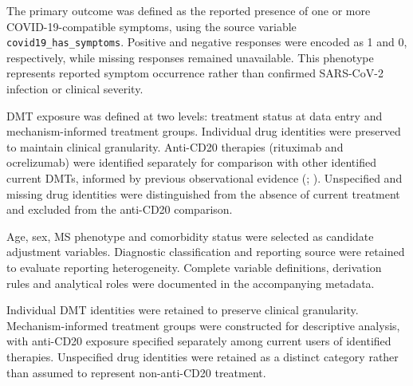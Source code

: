 \documentclass[
  british,
]{article}
\begin{document}
The primary outcome was defined as the reported presence of one or more
COVID-19-compatible symptoms, using the source variable
\texttt{covid19\_has\_symptoms}. Positive and negative responses were
encoded as 1 and 0, respectively, while missing responses remained
unavailable. This phenotype represents reported symptom occurrence
rather than confirmed SARS-CoV-2 infection or clinical severity.

DMT exposure was defined at two levels: treatment status at data entry
and mechanism-informed treatment groups. Individual drug identities were
preserved to maintain clinical granularity. Anti-CD20 therapies
(rituximab and ocrelizumab) were identified separately for comparison
with other identified current DMTs, informed by previous observational
evidence (;
). Unspecified and
missing drug identities were distinguished from the absence of current
treatment and excluded from the anti-CD20 comparison.

Age, sex, MS phenotype and comorbidity status were selected as candidate
adjustment variables. Diagnostic classification and reporting source
were retained to evaluate reporting heterogeneity. Complete variable
definitions, derivation rules and analytical roles were documented in
the accompanying metadata.

Individual DMT identities were retained to preserve clinical
granularity. Mechanism-informed treatment groups were constructed for
descriptive analysis, with anti-CD20 exposure specified separately among
current users of identified therapies. Unspecified drug identities were
retained as a distinct category rather than assumed to represent
non-anti-CD20 treatment.
\end{document}
